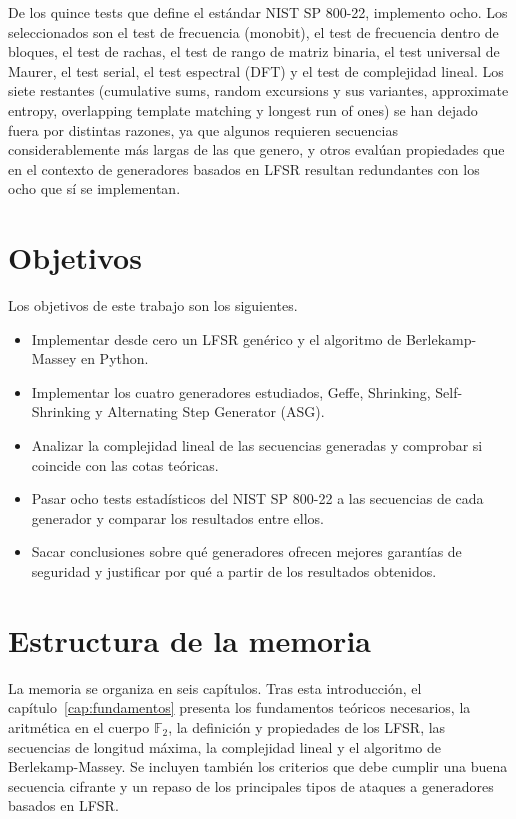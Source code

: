 De los quince tests que define el estándar NIST SP 800-22, implemento ocho.
Los seleccionados son el test de frecuencia (monobit), el test de frecuencia dentro de bloques, el test de rachas,
el test de rango de matriz binaria, el test universal de Maurer, el test serial, el test espectral (DFT)
y el test de complejidad lineal. Los siete restantes (cumulative sums, random excursions y sus variantes,
approximate entropy, overlapping template matching y longest run of ones)
se han dejado fuera por distintas razones, ya que algunos requieren secuencias considerablemente más largas de las que genero,
y otros evalúan propiedades que en el contexto de generadores basados en LFSR resultan redundantes con los ocho que sí se implementan.

\section{Objetivos}

Los objetivos de este trabajo son los siguientes.

\begin{itemize}
  \item Implementar desde cero un LFSR genérico y el algoritmo de Berlekamp-Massey en Python.
  \item Implementar los cuatro generadores estudiados, Geffe, Shrinking, Self-Shrinking y Alternating Step Generator (ASG).
  \item Analizar la complejidad lineal de las secuencias generadas y comprobar si coincide con las cotas teóricas.
  \item Pasar ocho tests estadísticos del NIST SP 800-22 a las secuencias de cada generador y comparar los resultados entre ellos.
  \item Sacar conclusiones sobre qué generadores ofrecen mejores garantías de seguridad
        y justificar por qué a partir de los resultados obtenidos.
\end{itemize}

\section{Estructura de la memoria}

La memoria se organiza en seis capítulos. Tras esta introducción, el capítulo~\ref{cap:fundamentos} presenta los fundamentos teóricos necesarios,
la aritmética en el cuerpo $\mathbb{F}_2$, la definición y propiedades de los LFSR, las secuencias de longitud máxima,
la complejidad lineal y el algoritmo de Berlekamp-Massey.
Se incluyen también los criterios que debe cumplir una buena secuencia cifrante y un repaso de los principales tipos de ataques a generadores basados en LFSR.

